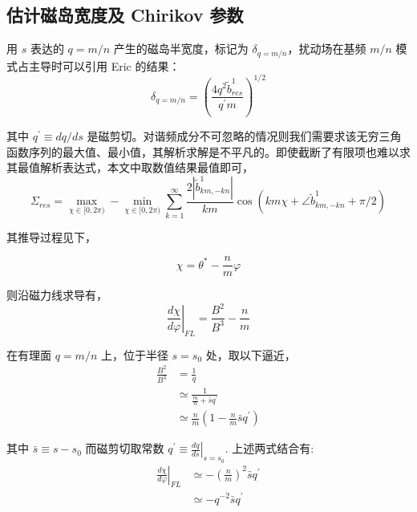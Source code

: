 \subsection{估计磁岛宽度及 Chirikov 参数}
用 $s$ 表达的 $q=m / n$ 产生的磁岛半宽度，标记为 $\delta_{q=m / n}$，扰动场在基频 $m/n$ 模式占主导时可以引用 Eric \cite{nardon_edge_2007} 的结果：
\begin{equation}
  \delta_{q=m / n}=\left(\frac{4 q^{2} \tilde{b}_{r e s}^{1}}{q^{\prime} m}\right)^{1 / 2}
\end{equation}

其中 $q^{\prime} \equiv d q / d s$ 是磁剪切。对谐频成分不可忽略的情况则我们需要求该无穷三角函数序列的最大值、最小值，其解析求解是不平凡的。即使截断了有限项也难以求其最值解析表达式，本文中取数值结果最值即可，
\begin{equation}
  \Sigma_{res} = \max_{\chi\in [0,2\pi)} - \min_{\chi\in [0,2\pi)}\sum_{k=1}^{\infty} \frac{2\left|\tilde{b}_{km,-kn}^{1}\right|}{km}   \cos \left(km\chi + \angle\tilde{b}_{km,-kn}^{1} + \pi/2 \right)
\end{equation}

其推导过程见下，

\begin{equation}
  \chi = \theta^*- \frac{n}{m} \varphi
\end{equation}

则沿磁力线求导有，
\begin{equation}\left.\frac{d \chi}{d \varphi}\right|_{F L}=\frac{B^{2}}{B^{3}}-\frac{n}{m}\end{equation}

在有理面 $q=m/n$ 上，位于半径 $s=s_0$ 处，取以下逼近，
\begin{equation}\begin{aligned}
  \frac{B^{2}}{B^{3}} &=\frac{1}{q} \\
  & \simeq \frac{1}{\frac{m}{n}+\bar{s} q^{\prime}} \\
  & \simeq \frac{n}{m}\left(1-\frac{n}{m} \bar{s} q^{\prime}\right)
  \end{aligned}\end{equation}

其中 $\bar{s} \equiv s-s_{0}$ 而磁剪切取常数 $\left.q^{\prime} \equiv \frac{d q}{d s}\right|_{s=s_{0}} .$ 上述两式结合有:
  \[
  \begin{aligned}
  \left.\frac{d \chi}{d \varphi}\right|_{F L} & \simeq-\left(\frac{n}{m}\right)^{2} \bar{s} q^{\prime} \\
  & \simeq-q^{-2} \bar{s} q^{\prime}
  \end{aligned}
  \]

